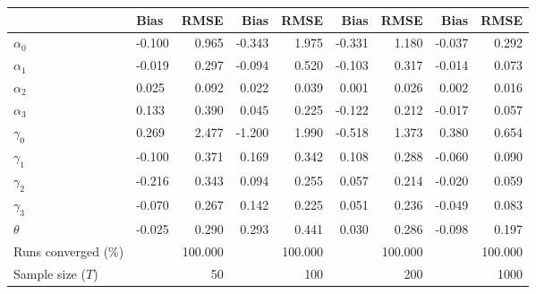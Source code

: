 
\begin{tabular}[t]{llrrrrrrr}
\toprule
  & Bias & RMSE & Bias & RMSE & Bias & RMSE & Bias & RMSE\\
\midrule
$\alpha_{0}$ & -0.100 & 0.965 & -0.343 & 1.975 & -0.331 & 1.180 & -0.037 & 0.292\\
$\alpha_{1}$ & -0.019 & 0.297 & -0.094 & 0.520 & -0.103 & 0.317 & -0.014 & 0.073\\
$\alpha_{2}$ & 0.025 & 0.092 & 0.022 & 0.039 & 0.001 & 0.026 & 0.002 & 0.016\\
$\alpha_{3}$ & 0.133 & 0.390 & 0.045 & 0.225 & -0.122 & 0.212 & -0.017 & 0.057\\
$\gamma_{0}$ & 0.269 & 2.477 & -1.200 & 1.990 & -0.518 & 1.373 & 0.380 & 0.654\\
$\gamma_{1}$ & -0.100 & 0.371 & 0.169 & 0.342 & 0.108 & 0.288 & -0.060 & 0.090\\
$\gamma_{2}$ & -0.216 & 0.343 & 0.094 & 0.255 & 0.057 & 0.214 & -0.020 & 0.059\\
$\gamma_{3}$ & -0.070 & 0.267 & 0.142 & 0.225 & 0.051 & 0.236 & -0.049 & 0.083\\
$\theta$ & -0.025 & 0.290 & 0.293 & 0.441 & 0.030 & 0.286 & -0.098 & 0.197\\
Runs converged (\%) &  & 100.000 &  & 100.000 &  & 100.000 &  & 100.000\\
Sample size ($T$) &  & 50 &  & 100 &  & 200 &  & 1000\\
\bottomrule
\end{tabular}
